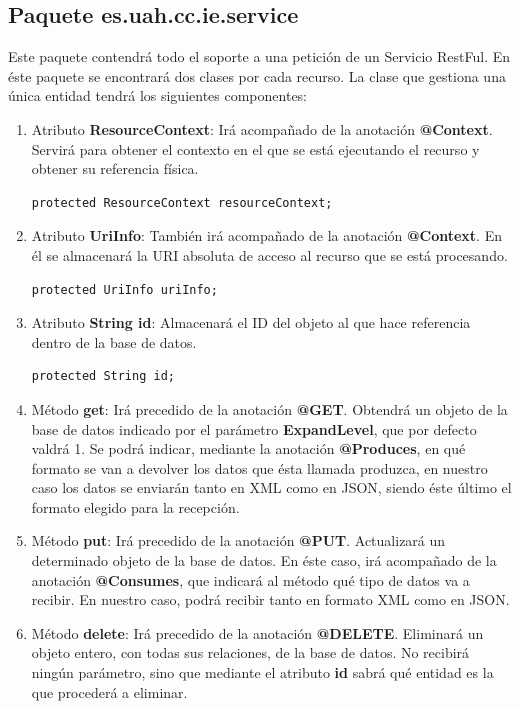 \subsection{Paquete es.uah.cc.ie.service}
Este paquete contendrá todo el soporte a una petición de un Servicio RestFul. En éste paquete se encontrará dos clases por cada recurso. La clase que gestiona una única entidad tendrá los siguientes componentes:
\begin{enumerate}
\item Atributo \textbf{ResourceContext}: Irá acompañado de la anotación \textbf{@Context}. Servirá para obtener el contexto en el que se está ejecutando el recurso y obtener su referencia física.\begin{verbatim}protected ResourceContext resourceContext;\end{verbatim} 
\item Atributo \textbf{UriInfo}: También irá acompañado de la anotación \textbf{@Context}. En él se almacenará la URI absoluta de acceso al recurso que se está procesando. \begin{verbatim}protected UriInfo uriInfo;\end{verbatim} 
\item Atributo \textbf{String id}: Almacenará el ID del objeto al que hace referencia dentro de la base de datos. \begin{verbatim}protected String id;\end{verbatim} 
\item Método \textbf{get}: Irá precedido de la anotación \textbf{@GET}. Obtendrá un objeto de la base de datos indicado por el parámetro \textbf{ExpandLevel}, que por defecto valdrá 1. Se podrá indicar, mediante la anotación \textbf{@Produces}, en qué formato se van a devolver los datos que ésta llamada produzca, en nuestro caso los datos se enviarán tanto en XML como en JSON, siendo éste último el formato elegido para la recepción.
\item Método \textbf{put}: Irá precedido de la anotación \textbf{@PUT}. Actualizará un determinado objeto de la base de datos. En éste caso, irá acompañado de la anotación \textbf{@Consumes}, que indicará al método qué tipo de datos va a recibir. En nuestro caso, podrá recibir tanto en formato XML como en JSON.
\item Método \textbf{delete}: Irá precedido de la anotación \textbf{@DELETE}. Eliminará un objeto entero, con todas sus relaciones, de la base de datos. No recibirá ningún parámetro, sino que mediante el atributo \textbf{id} sabrá qué entidad es la que procederá a eliminar.
\end{enumerate}

